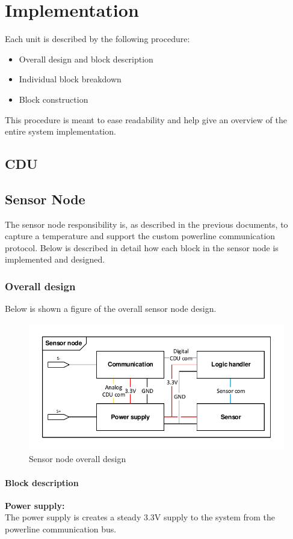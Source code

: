 \chapter{Implementation}
Each unit is described by the following procedure:
\begin{itemize}
\item Overall design and block description
\item Individual block breakdown
\item Block construction
\end{itemize}
This procedure is meant to ease readability and help give an overview of the entire system implementation.
\section{CDU}

\section{Sensor Node}
The sensor node responsibility is, as described in the previous documents, to capture a temperature and support the custom powerline communication protocol. Below is described in detail how each block in the sensor node is implemented and designed.

\subsection{Overall design}
Below is shown a figure of the overall sensor node design.
\begin{figure}
\centering
\includegraphics[width=.9\textwidth]{billeder/sn_overall_design}
\caption{Sensor node overall design}
\end{figure}

\subsubsection{Block description}
\textbf{Power supply:}\\
The power supply is creates a steady 3.3V supply to the system from the powerline communication bus.\\


